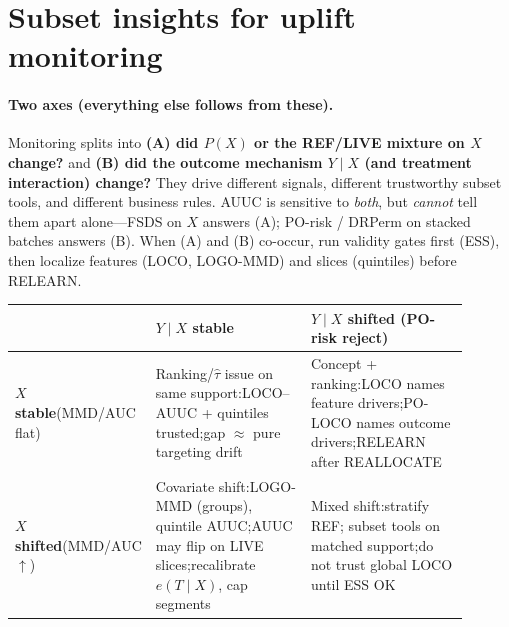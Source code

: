 
\section{Subset insights for uplift monitoring}

\paragraph{Two axes (everything else follows from these).}
Monitoring splits into \textbf{(A) did $P(X)$ or the REF/LIVE mixture on $X$ change?} and \textbf{(B) did the outcome mechanism $Y\mid X$ (and treatment interaction) change?}
They drive different signals, different trustworthy subset tools, and different business rules.
AUUC is sensitive to \emph{both}, but \emph{cannot} tell them apart alone---FSDS on $X$ answers (A); PO-risk / DRPerm on stacked batches answers (B).
When (A) and (B) co-occur, run validity gates first (ESS), then localize features (LOCO, LOGO-MMD) and slices (quintiles) before RELEARN.

\begin{center}
\small
\begin{tabular}{@{}p{0.18\linewidth}p{0.36\linewidth}p{0.36\linewidth}@{}}
\toprule
 & \textbf{$Y\mid X$ stable} & \textbf{$Y\mid X$ shifted (PO-risk reject)} \\
\midrule
\textbf{$X$ stable}\newline (MMD/AUC flat) &
Ranking/$\hat\tau$ issue on same support:\newline LOCO--AUUC + quintiles trusted;\newline gap $\approx$ pure targeting drift &
Concept + ranking:\newline LOCO names feature drivers;\newline PO-LOCO names outcome drivers;\newline RELEARN after REALLOCATE \\
\midrule
\textbf{$X$ shifted}\newline (MMD/AUC $\uparrow$) &
Covariate shift:\newline LOGO-MMD (groups), quintile AUUC;\newline AUUC may flip on LIVE slices;\newline recalibrate $e(T\mid X)$, cap segments &
Mixed shift:\newline stratify REF; subset tools on matched support;\newline do not trust global LOCO until ESS OK \\
\bottomrule
\end{tabular}
\end{center}


